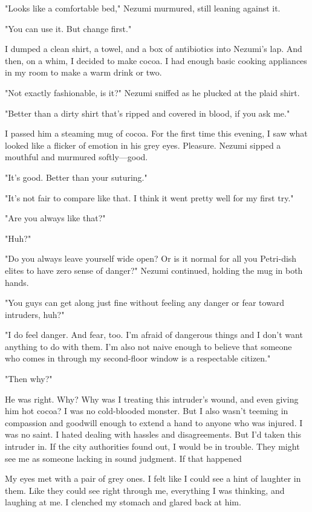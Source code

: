 \myspace

"Looks like a comfortable bed," Nezumi murmured, still leaning against
it.

"You can use it. But change first."

I dumped a clean shirt, a towel, and a box of antibiotics into Nezumi's
lap. And then, on a whim, I decided to make cocoa. I had enough basic
cooking appliances in my room to make a warm drink or two.

"Not exactly fashionable, is it?" Nezumi sniffed as he plucked at the
plaid shirt.

"Better than a dirty shirt that's ripped and covered in blood, if you
ask me."

I passed him a steaming mug of cocoa. For the first time this evening, I
saw what looked like a flicker of emotion in his grey eyes. Pleasure.
Nezumi sipped a mouthful and murmured softly---good.

"It's good. Better than your suturing."

"It's not fair to compare like that. I think it went pretty well for my
first try."

"Are you always like that?"

"Huh?"

"Do you always leave yourself wide open? Or is it normal for all you
Petri-dish elites to have zero sense of danger?" Nezumi continued,
holding the mug in both hands.

"You guys can get along just fine without feeling any danger or fear
toward intruders, huh?"

"I do feel danger. And fear, too. I'm afraid of dangerous things and I
don't want anything to do with them. I'm also not naive enough to
believe that someone who comes in through my second-floor window is a
respectable citizen."

"Then why?"

He was right. Why? Why was I treating this intruder's wound, and even
giving him hot cocoa? I was no cold-blooded monster. But I also wasn't
teeming in compassion and goodwill enough to extend a hand to anyone who
was injured. I was no saint. I hated dealing with hassles and
disagreements. But I'd taken this intruder in. If the city authorities
found out, I would be in trouble. They might see me as someone lacking
in sound judgment. If that happened\el 

My eyes met with a pair of grey ones. I felt like I could see a hint of
laughter in them. Like they could see right through me, everything I was
thinking, and laughing at me. I clenched my stomach and glared back at
him.


